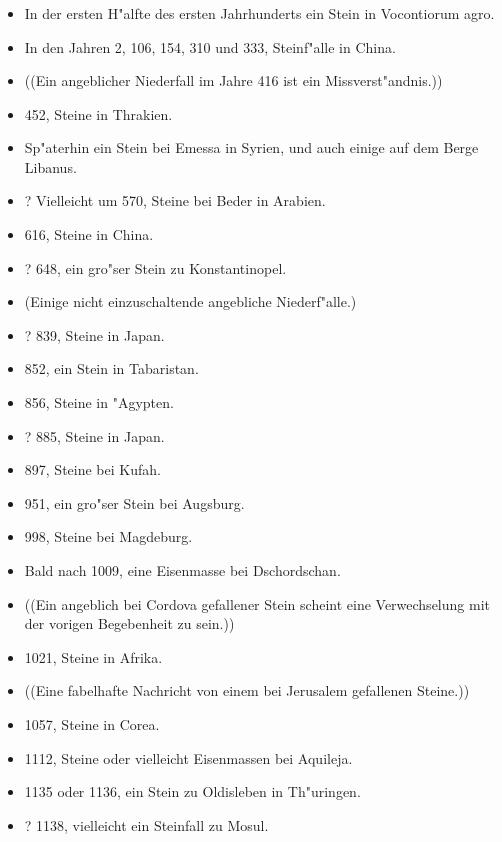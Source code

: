 \documentclass[a4paper, 11pt, oneside, polutonikogreek, german]{article}
\begin{document}
\subsubsection*{}
\begin{itemize}
    \item In der ersten H"alfte des ersten Jahrhunderts ein Stein in Vocontiorum agro.
    \item In den Jahren 2, 106, 154, 310 und 333, Steinf"alle in China.
    \item ((Ein angeblicher Niederfall im Jahre 416 ist ein Missverst"andnis.))
    \item 452, Steine in Thrakien.
    \item Sp"aterhin ein Stein bei Emessa in Syrien, und auch einige auf dem Berge Libanus.
    \item ? Vielleicht um 570, Steine bei Beder in Arabien.
    \item 616, Steine in China.
    \item ? 648, ein gro"ser Stein zu Konstantinopel.
    \item (Einige nicht einzuschaltende angebliche Niederf"alle.)
    \item ? 839, Steine in Japan.
    \item 852, ein Stein in Tabaristan.
    \item 856, Steine in "Agypten.
    \item ? 885, Steine in Japan.
    \item 897, Steine bei Kufah.
    \item 951, ein gro"ser Stein bei Augsburg.
    \item 998, Steine bei Magdeburg.
    \item Bald nach 1009, eine Eisenmasse bei Dschordschan.
    \item ((Ein angeblich bei Cordova gefallener Stein scheint eine Verwechselung mit der vorigen Begebenheit zu sein.))
    \item 1021, Steine in Afrika.
    \item ((Eine fabelhafte Nachricht von einem bei Jerusalem gefallenen Steine.))
    \item 1057, Steine in Corea.
    \item 1112, Steine oder vielleicht Eisenmassen bei Aquileja.
    \item 1135 oder 1136, ein Stein zu Oldisleben in Th"uringen.
    \item ? 1138, vielleicht ein Steinfall zu Mosul.

\end{itemize}
\end{document}
